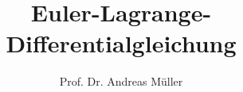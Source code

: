 %
%
%


\beamertemplatenavigationsymbolsempty
\title[EL-DGL]{Euler-Lagrange-Differentialgleichung}
\author[A.~Müller]{Prof. Dr. Andreas Müller}
\date[]{}

